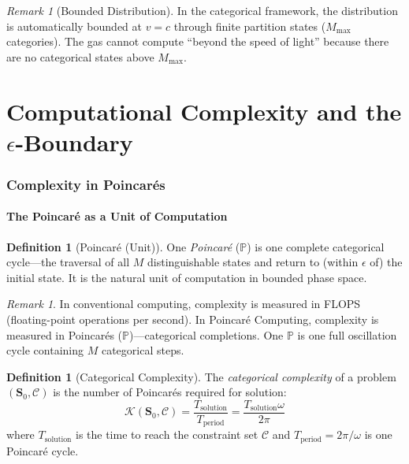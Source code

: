 \documentclass[twocolumn,10pt,a4paper]{article}
\theoremstyle{plain}
\theoremstyle{definition}
\newtheorem{definition}[theorem]{Definition}
\theoremstyle{remark}
\newtheorem{remark}[theorem]{Remark}
\newcommand{\Scoord}{\mathbf{S}}
\begin{document}
\begin{remark}[Bounded Distribution]
In the categorical framework, the distribution is automatically bounded at $v = c$ through finite partition states ($M_{\max}$ categories). The gas cannot compute ``beyond the speed of light'' because there are no categorical states above $M_{\max}$.
\end{remark}


\part{Computational Complexity and the $\epsilon$-Boundary}
\label{part:complexity}

\section{Complexity in Poincar\'{e}s}
\label{sec:poincare_complexity}

\subsection{The Poincar\'{e} as a Unit of Computation}

\begin{definition}[Poincar\'{e} (Unit)]
\label{def:poincare_unit}
One \emph{Poincar\'{e}} ($\mathbb{P}$) is one complete categorical cycle---the traversal of all $M$ distinguishable states and return to (within $\epsilon$ of) the initial state. It is the natural unit of computation in bounded phase space.
\end{definition}

\begin{remark}
In conventional computing, complexity is measured in FLOPS (floating-point operations per second). In Poincar\'{e} Computing, complexity is measured in Poincar\'{e}s ($\mathbb{P}$)---categorical completions. One $\mathbb{P}$ is one full oscillation cycle containing $M$ categorical steps.
\end{remark}

\begin{definition}[Categorical Complexity]
\label{def:complexity}
The \emph{categorical complexity} of a problem $(\Scoord_0, \mathcal{C})$ is the number of Poincar\'{e}s required for solution:
\begin{equation}
    \mathcal{K}(\Scoord_0, \mathcal{C}) = \frac{T_{\mathrm{solution}}}{T_{\mathrm{period}}} = \frac{T_{\mathrm{solution}} \omega}{2\pi}
\end{equation}
where $T_{\mathrm{solution}}$ is the time to reach the constraint set $\mathcal{C}$ and $T_{\mathrm{period}} = 2\pi/\omega$ is one Poincar\'{e} cycle.
\end{definition}
\end{document}

